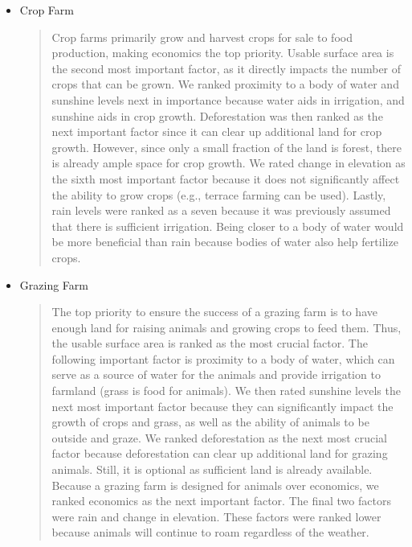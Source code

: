 \documentclass{mcmthesis}
\begin{document}
\begin{itemize}
    \item Crop Farm
    \begin{quote} 
       Crop farms primarily grow and harvest crops for sale to food production, making economics the top priority. Usable surface area is the second most important factor, as it directly impacts the number of crops that can be grown. We ranked proximity to a body of water and sunshine levels next in importance because water aids in irrigation, and sunshine aids in crop growth. Deforestation was then ranked as the next important factor since it can clear up additional land for crop growth. However, since only a small fraction of the land is forest, there is already ample space for crop growth. We rated change in elevation as the sixth most important factor because it does not significantly affect the ability to grow crops (e.g., terrace farming can be used). Lastly, rain levels were ranked as a seven because it was previously assumed that there is sufficient irrigation. Being closer to a body of water would be more beneficial than rain because bodies of water also help fertilize crops.
    \end{quote}

    \item Grazing Farm
    \begin{quote}
        The top priority to ensure the success of a grazing farm is to have enough land for raising animals and growing crops to feed them. Thus, the usable surface area is ranked as the most crucial factor. The following important factor is proximity to a body of water, which can serve as a source of water for the animals and provide irrigation to farmland (grass is food for animals). We then rated sunshine levels the next most important factor because they can significantly impact the growth of crops and grass, as well as the ability of animals to be outside and graze.
        We ranked deforestation as the next most crucial factor because deforestation can clear up additional land for grazing animals. Still, it is optional as sufficient land is already available. Because a grazing farm is designed for animals over economics, we ranked economics as the next important factor. The final two factors were rain and change in elevation. These factors were ranked lower because animals will continue to roam regardless of the weather.
    \end{quote}


\end{itemize}
\end{document}
